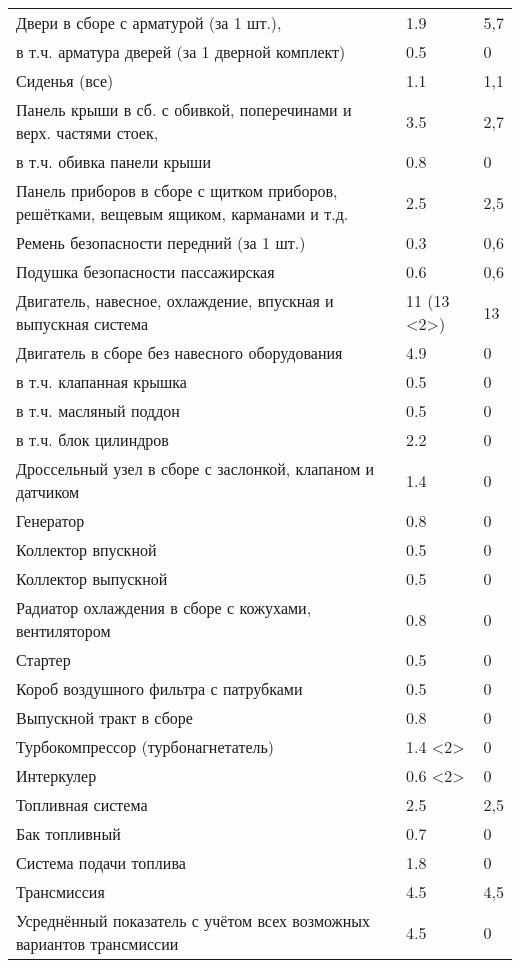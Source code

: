 \begin{longtable}{|p{9cm}|p{4cm}|p{2cm}|}
 		Двери в сборе с арматурой (за 1 шт.), & 1.9 & 5,7 \\
 		в т.ч. арматура дверей (за 1    дверной комплект) & 0.5 & 0 \\
 		Сиденья (все) & 1.1 & 1,1 \\
 		Панель крыши в сб. с обивкой, поперечинами и верх. частями стоек, & 3.5 & 2,7 \\
 		в т.ч. обивка панели крыши & 0.8 & 0 \\
 		Панель приборов в сборе с щитком приборов, решётками, вещевым ящиком, карманами и т.д. & 2.5 & 2,5 \\
 		Ремень безопасности передний (за 1 шт.) & 0.3 & 0,6 \\
 		Подушка безопасности пассажирская & 0.6 & 0,6 \\
 		Двигатель, навесное, охлаждение, впускная и выпускная система & 11 (13 \textless{}2\textgreater{}) & 13 \\
 		Двигатель в сборе без навесного оборудования & 4.9 & 0 \\
 		в т.ч. клапанная крышка & 0.5 & 0 \\
 		в т.ч. масляный поддон & 0.5 & 0 \\
 		в т.ч. блок цилиндров & 2.2 & 0 \\
 		Дроссельный узел в сборе с заслонкой, клапаном и датчиком & 1.4 & 0 \\
 		Генератор & 0.8 & 0 \\
 		Коллектор впускной & 0.5 & 0 \\
 		Коллектор выпускной & 0.5 & 0 \\
 		Радиатор охлаждения в сборе с кожухами, вентилятором & 0.8 & 0 \\
 		Стартер & 0.5 & 0 \\
 		Короб воздушного фильтра с патрубками & 0.5 & 0 \\
 		Выпускной тракт в сборе & 0.8 & 0 \\
 		Турбокомпрессор (турбонагнетатель) & 1.4 \textless{}2\textgreater{} & 0 \\
 		Интеркулер & 0.6 \textless{}2\textgreater{} & 0 \\
 		Топливная система & 2.5 & 2,5 \\
 		Бак топливный & 0.7 & 0 \\
 		Система подачи топлива & 1.8 & 0 \\
 		Трансмиссия & 4.5 & 4,5 \\
 		Усреднённый показатель с учётом всех возможных вариантов трансмиссии & 4.5 & 0 \\

\end{longtable}
